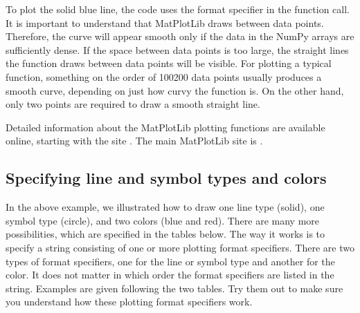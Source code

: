 \documentclass[letterpaper,10pt,english]{sphinxmanual}
\begin{document}
\ignorespaces 
\sphinxAtStartPar
To plot the solid blue line, the code uses the  format specifier in the  function call.  It is important to understand that MatPlotLib draws  between data points.  Therefore, the curve will appear smooth only if the data in the NumPy arrays are sufficiently dense.  If the space between data points is too large, the straight lines the  function draws between data points will be visible.  For plotting a typical function, something on the order of 100\sphinxhyphen{}200 data points usually produces a smooth curve, depending on just how curvy the function is.  On the other hand, only two points are required to draw a smooth straight line.

\sphinxAtStartPar
Detailed information about the MatPlotLib plotting functions are available online, starting with the site .  The main MatPlotLib site is .


\subsection{Specifying line and symbol types and colors}
\label{\detokenize{chap5/chap5_plot:specifying-line-and-symbol-types-and-colors}}
\sphinxAtStartPar
In the above example, we illustrated how to draw one line type (solid), one symbol type (circle), and two colors (blue and red).  There are many more possibilities, which are specified in the tables below.  The way it works is to specify a string consisting of one or more plotting format specifiers.  There are two types of format specifiers, one for the line or symbol type and another for the color.  It does not matter in which order the  format specifiers are listed in the string.  Examples are given following the two tables.  Try them out to make sure you understand how these plotting format specifiers work.
\end{document}
